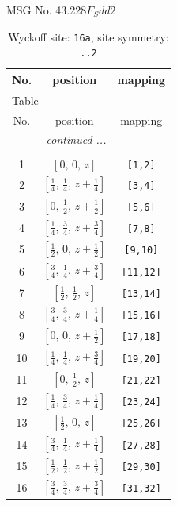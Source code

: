 \documentclass[fleqn,8pt]{jsarticle}
\begin{document}
\setcounter{MaxMatrixCols}{32}

\renewcommand{\tablename}{Table~}
\renewcommand{\figurename}{Figure~}
\begin{center}
\LARGE
MSG No. 43.228\quad$F_{S}dd2$
\end{center}
\renewcommand{\arraystretch}{1.2}
\begin{longtable}{ccc}
\caption{Wyckoff site: {\tt 16a}, site symmetry: {\tt ..2}}
 \\
 \hline \hline
No. & position & mapping \\ \hline \endfirsthead

\multicolumn{2}{l}{\tablename\ \thetable{}} \\
 \hline \hline
No. & position & mapping \\ \hline \endhead

 \hline \hline
\multicolumn{2}{r}{\footnotesize\it continued ...} \\ \endfoot

 \hline \hline
\multicolumn{2}{r}{} \\ \endlastfoot

1 & $\left[ 0,\, 0,\, z \right]$ & {\tt [1,2]} \\ \hline
2 & $\left[ \frac{1}{4},\, \frac{1}{4},\, z + \frac{1}{4} \right]$ & {\tt [3,4]} \\ \hline
3 & $\left[ 0,\, \frac{1}{2},\, z + \frac{1}{2} \right]$ & {\tt [5,6]} \\ \hline
4 & $\left[ \frac{1}{4},\, \frac{3}{4},\, z + \frac{3}{4} \right]$ & {\tt [7,8]} \\ \hline
5 & $\left[ \frac{1}{2},\, 0,\, z + \frac{1}{2} \right]$ & {\tt [9,10]} \\ \hline
6 & $\left[ \frac{3}{4},\, \frac{1}{4},\, z + \frac{3}{4} \right]$ & {\tt [11,12]} \\ \hline
7 & $\left[ \frac{1}{2},\, \frac{1}{2},\, z \right]$ & {\tt [13,14]} \\ \hline
8 & $\left[ \frac{3}{4},\, \frac{3}{4},\, z + \frac{1}{4} \right]$ & {\tt [15,16]} \\ \hline
9 & $\left[ 0,\, 0,\, z + \frac{1}{2} \right]$ & {\tt [17,18]} \\ \hline
10 & $\left[ \frac{1}{4},\, \frac{1}{4},\, z + \frac{3}{4} \right]$ & {\tt [19,20]} \\ \hline
11 & $\left[ 0,\, \frac{1}{2},\, z \right]$ & {\tt [21,22]} \\ \hline
12 & $\left[ \frac{1}{4},\, \frac{3}{4},\, z + \frac{1}{4} \right]$ & {\tt [23,24]} \\ \hline
13 & $\left[ \frac{1}{2},\, 0,\, z \right]$ & {\tt [25,26]} \\ \hline
14 & $\left[ \frac{3}{4},\, \frac{1}{4},\, z + \frac{1}{4} \right]$ & {\tt [27,28]} \\ \hline
15 & $\left[ \frac{1}{2},\, \frac{1}{2},\, z + \frac{1}{2} \right]$ & {\tt [29,30]} \\ \hline
16 & $\left[ \frac{3}{4},\, \frac{3}{4},\, z + \frac{3}{4} \right]$ & {\tt [31,32]} \\
\end{longtable}
\end{document}
